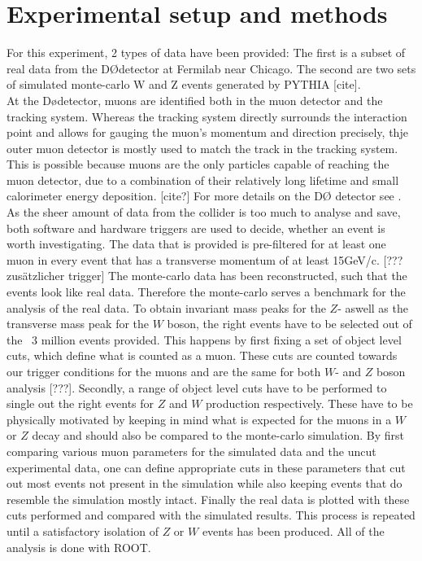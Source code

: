 \documentclass[twoside,        %
               BCOR12mm,       %
               ngerman,english, %
               fleqn,headsepline=false,footsepline=false
              ]{Vorlage/MFPREPORT}
\begin{document}
\section{Experimental setup and methods}
\label{sec:setup}
For this experiment, 2 types of data have been provided: The first is a subset
of real data from the D\O\;detector at Fermilab near Chicago. The second are two
sets of simulated monte-carlo W and Z events generated by PYTHIA [cite].\\
At the D\o detector, muons are identified  both in the muon detector and the
tracking system. Whereas the tracking system directly surrounds the interaction
point and allows for gauging the muon's momentum and direction precisely, thje
outer muon detector is mostly used to match the track in the tracking system.
This is possible because muons are the only particles capable of reaching the
muon detector, due to a combination of their relatively long lifetime and small calorimeter
energy deposition. [cite?] For more details on the D\O\;  detector see
\cite{d0}.
As the sheer amount of data from the collider is too much to analyse and save,
both software and hardware triggers are used to decide, whether an event is
worth investigating. The data that is provided is pre-filtered for at least one
muon in every event that has a transverse momentum of at least 15\;GeV/c. [???
zusätzlicher trigger] The monte-carlo data has been reconstructed, such that the
events look like real data. Therefore the monte-carlo serves a benchmark for
the analysis of the real data.
To obtain invariant mass peaks for the $Z$- aswell as the transverse mass peak
for the $W$ boson, the right events have to be selected out of the ~3 million
events provided. This happens by first fixing a set of object level cuts, which
define what is counted as a muon. These cuts are counted towards our trigger
conditions for the muons and are the same for both $W$- and $Z$ boson analysis
[???]. Secondly, a range of object level cuts have to be performed to single
out the right events for $Z$ and $W$ production respectively. These have to be
physically motivated by keeping in mind what is expected for the muons in a
$W$ or $Z$ decay and should also be compared to the monte-carlo simulation. By
first comparing various muon parameters for the simulated data and the uncut
experimental data, one can define appropriate cuts in these parameters that cut
out most events not present in the simulation while also keeping events that do
resemble the simulation mostly intact. Finally the real data is plotted with
these cuts performed and compared with the simulated results. This process is
repeated until a satisfactory isolation of $Z$ or $W$ events has been produced.
All of the analysis is done with ROOT.
\end{document}
